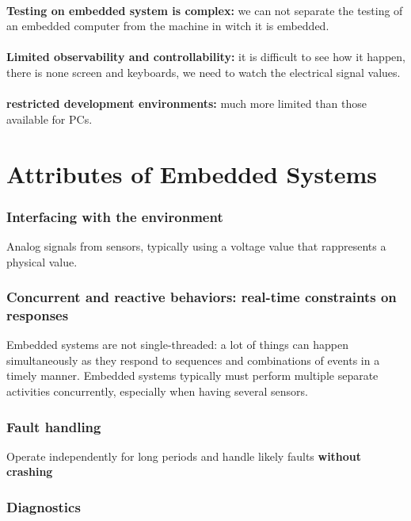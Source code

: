 \paragraph{}

\textbf{Testing on embedded system is complex: }we can not separate the testing of an embedded computer from the machine in witch it is embedded.
\paragraph{}
\textbf{Limited observability and controllability: }it is difficult to see how it happen, there is none screen and keyboards, we need to watch the electrical signal values.
\paragraph{}
\textbf{restricted development environments: }much more limited than those available for PCs.

\section{Attributes of Embedded Systems}

\subsubsection{Interfacing with the environment}

Analog signals from sensors, typically using a voltage value that rappresents a physical value.

\subsubsection{Concurrent and reactive behaviors: real-time constraints on responses}
Embedded systems are not single-threaded: a lot of things can happen simultaneously as they respond to
sequences and combinations of events in a timely manner.
Embedded systems typically must perform multiple separate activities concurrently, especially when
having several sensors.

\subsubsection{Fault handling}
Operate independently for long periods and handle likely faults \textbf{without crashing}


\subsubsection{Diagnostics}

